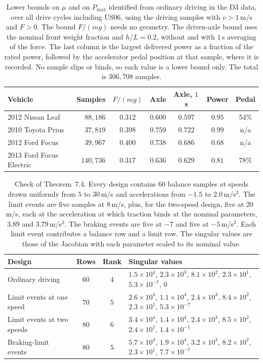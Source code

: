 \documentclass[12pt, twoside]{amsart}
\theoremstyle{definition}
\newcommand{\mainref}[2]{#2}
\begin{document}
\begin{table}[htbp]
\centering\small
\caption{Lower bounds on $\mu$ and on $P_{\max}$ identified from ordinary driving in the D3 data, over all drive cycles including US06, using the driving samples with $v>1$\,m/s and $F>0$. The bound $F/(mg)$ needs no geometry. The driven-axle bound uses the nominal front weight fraction and $h/L=0.2$, without and with $1$\,s averaging of the force. The last column is the largest delivered power as a fraction of the rated power, followed by the accelerator pedal position at that sample, where it is recorded. No sample slips or binds, so each value is a lower bound only. The total is $306{,}708$ samples.}\label{tab:app-d3}
\begin{tabular}{lrccccc}
\toprule
Vehicle & Samples & $F/(mg)$ & Axle & Axle, $1$\,s & Power & Pedal\\
\midrule
2012 Nissan Leaf & $88{,}186$ & $0.312$ & $0.600$ & $0.597$ & $0.95$ & $54\%$\\
2010 Toyota Prius & $37{,}819$ & $0.398$ & $0.759$ & $0.722$ & $0.99$ & n/a\\
2012 Ford Focus & $39{,}967$ & $0.400$ & $0.738$ & $0.686$ & $0.68$ & n/a\\
2013 Ford Focus Electric & $140{,}736$ & $0.317$ & $0.636$ & $0.629$ & $0.81$ & $78\%$\\
\bottomrule
\end{tabular}
\end{table}
\begin{table}[htbp]
\centering\small
\caption{Check of Theorem~\mainref{thm:jointid}{7.4}. Every design contains $60$ balance samples at speeds drawn uniformly from $5$ to $30$\,m/s and accelerations from $-1.5$ to $2.0$\,m/s$^2$. The limit events are five samples at $8$\,m/s, plus, for the two-speed design, five at $20$\,m/s, each at the acceleration at which traction binds at the nominal parameters, $3.89$ and $3.79$\,m/s$^2$. The braking events are five at $-7$ and five at $-5$\,m/s$^2$. Each limit event contributes a balance row and a limit row. The singular values are those of the Jacobian with each parameter scaled to its nominal value.}\label{tab:app-fisher}
\begin{tabular}{>{\raggedright\arraybackslash}p{3.6cm}cc>{\raggedright\arraybackslash}p{5.6cm}}
\toprule
Design & Rows & Rank & Singular values\\
\midrule
Ordinary driving & $60$ & $4$ & $1.5\times10^{4}$, $2.3\times10^{3}$, $8.1\times10^{2}$, $2.3\times10^{1}$, $5.3\times10^{-7}$, $0$\\
Limit events at one speed & $70$ & $5$ & $2.6\times10^{4}$, $1.1\times10^{4}$, $2.4\times10^{3}$, $8.4\times10^{2}$, $2.3\times10^{1}$, $5.3\times10^{-7}$\\
Limit events at two speeds & $80$ & $6$ & $3.4\times10^{4}$, $1.4\times10^{4}$, $2.4\times10^{3}$, $8.5\times10^{2}$, $2.4\times10^{1}$, $1.4\times10^{-1}$\\
Braking-limit events & $80$ & $5$ & $5.7\times10^{4}$, $1.9\times10^{4}$, $3.2\times10^{3}$, $8.2\times10^{2}$, $2.3\times10^{1}$, $7.7\times10^{-7}$\\
\bottomrule
\end{tabular}
\end{table}
\end{document}
